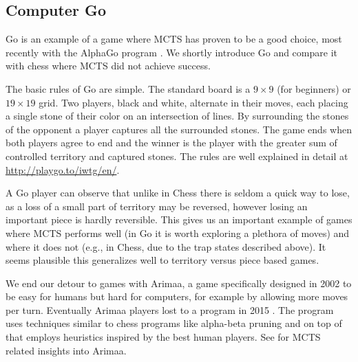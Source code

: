 \subsection{Computer Go}

Go is an example of a game where MCTS has proven to be a good choice,
most recently with the AlphaGo program \parencite{alphago}.
We shortly introduce Go and compare it with chess where MCTS did not
achieve success.

The basic rules of Go are simple. The
standard board is a $9\times9$ (for beginners) or $19 \times 19$ grid.
Two players, black and white, alternate in their moves, each
placing a single stone of their color on an intersection of lines.
By surrounding the stones of the opponent a player captures all the
surrounded stones. The game ends when both players agree to end and the
winner is the player with the greater sum of controlled territory and
captured stones.
The rules are well explained in detail at
\href{http://playgo.to/iwtg/en/}{http://playgo.to/iwtg/en/}.

A Go player can observe that unlike in Chess there is seldom a quick way
to lose, as a loss of a small part of territory may be reversed, however
losing an important piece is hardly reversible.
This gives us an important example of games where MCTS performs well (in
Go it is worth exploring a plethora of moves) and where it does not
(e.g., in Chess, due to the trap states described above).
It seems plausible this
generalizes well to territory versus piece based games.

We end our detour to games with Arimaa, a game specifically designed in
2002 to be easy for humans but hard for computers, for example by
allowing more moves per turn. Eventually Arimaa players lost to a
program in 2015 \parencite{arimaa}. The program uses techniques similar
to chess programs like alpha-beta pruning and on top of that employs
heuristics inspired by the best human players. See \parencite{jakl} for
MCTS related insights into Arimaa.
